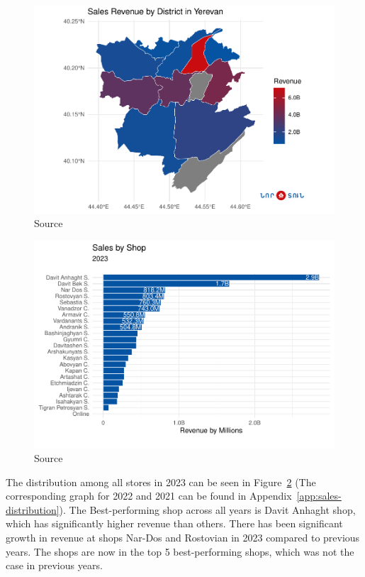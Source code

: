 \documentclass[conference]{IEEEtran}
\begin{document}
\begin{figure}[htbp]
\centering
\includegraphics[width=\columnwidth,keepaspectratio]{./figures/sales_by_map_yerevan.pdf}
\caption{Source \cite{mapYerevan}}
\label{fig:sales_by_map_yerevan}
\end{figure}

\begin{figure}[htbp]
\centering
\includegraphics[width=\columnwidth,keepaspectratio]{./figures/sales_by_shop_2023_sales.pdf}
\caption{Source \cite{RevenuDistribution}}
\label{fig:sales_by_shop_2023}
\end{figure}

The distribution among all stores in 2023 can be seen in Figure~\ref{fig:sales_by_shop_2023} (The corresponding graph for 2022 and 2021 can be found in Appendix~\autoref{app:sales-distribution}). The Best-performing shop across all years is Davit Anhaght shop, which has significantly higher revenue than others. There has been significant growth in revenue at shops Nar-Dos and Rostovian in 2023 compared to previous years. The shops are now in the top 5 best-performing shops, which was not the case in previous years.
\end{document}
